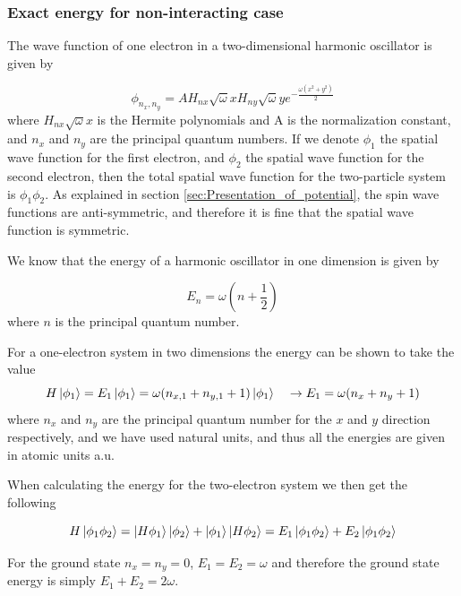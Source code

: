 \documentclass[norsk,a4paper,12pt]{article}
\begin{document}
\subsubsection{Exact energy for non-interacting case}

The wave function of one electron in a two-dimensional harmonic oscillator is given by

\begin{equation}
	\label{eq:one_e_wf_ho}
	\phi_{n_x, n_y} = A H_{nx} \sqrt{\omega} x H_{ny} \sqrt{\omega} y e^{-\frac{\omega(x^2 + y^2)}{2}}
\end{equation}
where $H_{nx} \sqrt{\omega} x$ is the Hermite polynomials and A is the normalization constant, and $n_x$ and $n_y$ are the principal quantum numbers. If we denote $\phi_1$ the spatial wave function for the first electron, and $\phi_2$ the spatial wave function for the second electron, then the total spatial wave function for the two-particle system is $\phi_1 \phi_2$. As explained in section \ref{sec:Presentation_of_potential}, the spin wave functions are anti-symmetric, and therefore it is fine that the spatial wave function is symmetric.

We know that the energy of a harmonic oscillator in one dimension is given by

\begin{equation}
	\label{eq:HO_energy}
	E_n = \omega (n + \frac{1}{2} )
\end{equation}
where $n$ is the principal quantum number.

For a one-electron system in two dimensions the energy can be shown to take the value 
\begin{equation}
H \ket{\phi_1} = E_1 \ket{\phi_1} = \omega(n_{x,1} + n_{y,1} + 1) \ket{\phi_1} \quad  \rightarrow E_1 = \omega(n_x + n_y + 1)
	\label{eq:exact_E_1P1D}
\end{equation}
where $n_x$ and $n_y$ are the principal quantum number for the $x$ and $y$ direction respectively, and we have used natural units, and thus all the energies are given in atomic units a.u.

When calculating the energy for the two-electron system we then get the following

\begin{equation}
	H \ket{\phi_1 \phi_2} = \ket{H \phi_1 } \ket{\phi_2} + \ket{\phi_1} \ket{H \phi_2} = E_1 \ket{\phi_1 \phi_2} + E_2 \ket{\phi_1 \phi_2} 
\end{equation}

For the ground state $n_x = n_y = 0$, $E_1 = E_2 = \omega$ and therefore the ground state energy is simply $E_1 + E_2 = 2\omega$. 
\end{document}
